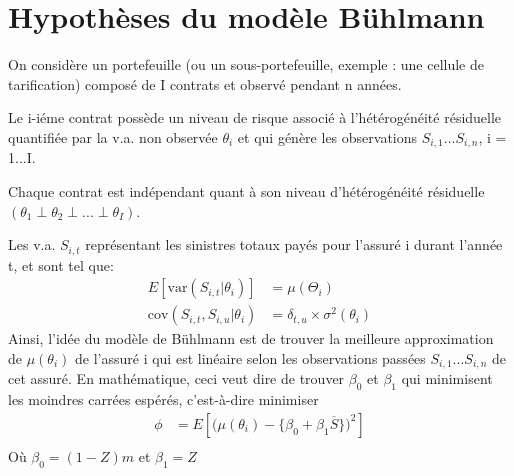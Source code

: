 \documentclass[11pt,french]{report}
\begin{document}
\section{Hypothèses du modèle Bühlmann}
\label{sec:hypo:buhl}
On considère un portefeuille (ou un sous-portefeuille, exemple : une cellule de tarification) composé de I contrats et observé pendant n années.

Le i-iéme contrat possède un niveau de risque associé à l'hétérogénéité résiduelle quantifiée par la v.a. non observée $\theta_i$ et qui génère les observations $S_{i,1}...S_{i,n} $, i = 1...I.

Chaque contrat est indépendant quant à son niveau d'hétérogénéité résiduelle $(\theta_1 \perp \theta_2 \perp...\perp\theta_I)$.

Les v.a. $S_{i,t}$ représentant les sinistres totaux payés pour l'assuré i durant l'année t, et sont tel que:
\begin{align*}
E[\text{var}(S_{i,t}|\theta_i)] &= \mu(\Theta_i) \\
\text{cov}(S_{i,t}, S_{i,u}|\theta_i) &= \delta_{t,u} \times \sigma^2(\theta_i)
\end{align*}
Ainsi, l'idée du modèle de Bühlmann est de trouver la meilleure approximation de $\mu(\theta_i)$ de l'assuré i qui est linéaire selon les observations passées $S_{i,1}...S_{i,n} $ de cet assuré.
En mathématique, ceci veut dire de trouver $\beta_0$ et $\beta_1$ qui minimisent les moindres carrées espérés, c'est-à-dire minimiser
\begin{align*}
\phi &= E[\big( \mu(\theta_i) - \lbrace\beta_0 + \beta_1 \overline{S}\rbrace \big)^2] \\
\end{align*}
Où $\beta_0 = (1 - Z)m$ et $\beta_1 =Z$
\\
\end{document}
